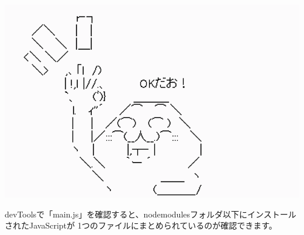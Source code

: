 \begin{reviewimage}%
%
\label{image:02-create-react-app:webpack_test01}
\end{reviewimage}
\begin{reviewimage}[H]%
\includegraphics[width=0.6\maxwidth]{./images/02-create-react-app/ok2.png}%
\label{image:02-create-react-app:ok2}
\end{reviewimage}

\clearpage


devToolsで「main.js」を確認すると、node\textunderscore{}modulesフォルダ以下にインストールされたJavaScriptが
1つのファイルにまとめられているのが確認できます。

